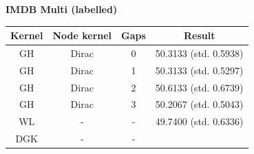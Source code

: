 \documentclass{article}
\begin{document}
\textbf{IMDB Multi (labelled)}\\
\begin{minipage}{0.6\linewidth}
	\hspace*{-1in}

	\label{fig:imdb_multi_labelled}
\end{minipage}
\begin{minipage}[c]{0.5\linewidth}	
	\centering
	\begin{tabular}{c|c|c|c}
		Kernel & Node kernel & Gaps & Result\\
		\hline
		GH & Dirac & 0 & 50.3133 (std. 0.5938) \\
		GH & Dirac & 1 & 50.3133 (std. 0.5297) \\
		GH & Dirac & 2 & 50.6133 (std. 0.6739) \\
		GH & Dirac & 3 & 50.2067 (std. 0.5043) \\
		WL & - & - & 49.7400 (std. 0.6336)\\
		DGK & - & - & \\
	\end{tabular}
	\label{table:imdb_multi_labelled}
\end{minipage}
\end{document}
